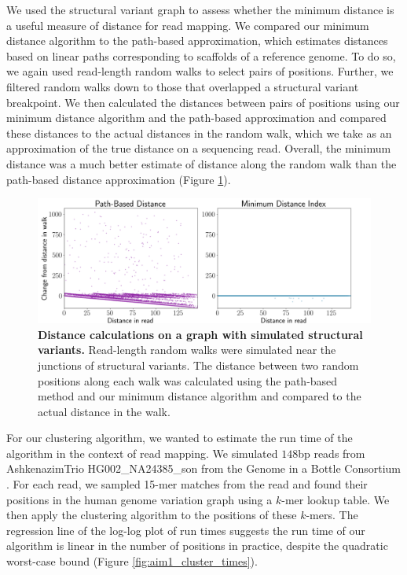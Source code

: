 \documentclass[11pt]{ucscthesis}
\begin{document}
We used the structural variant graph to assess whether the minimum distance is a useful measure of distance for read mapping.
We compared our minimum distance algorithm to the path-based approximation, which estimates distances based on linear paths corresponding to scaffolds of a reference genome.
To do so, we again used read-length random walks to select pairs of positions.
Further, we filtered random walks down to those that overlapped a structural variant breakpoint.
We then calculated the distances between pairs of positions using our minimum distance algorithm and the path-based approximation and compared these distances to the actual distances in the random walk, which we take as an approximation of the true distance on a sequencing read.
Overall, the minimum distance was a much better estimate of distance along the random walk than the path-based distance approximation (Figure \ref{fig:aim1_sv_distances}).


\begin{figure}[H]
    \centering
    \includegraphics[width=\columnwidth]{aim1_sv_distances.png}
    \caption[Distance calculations on a graph with simulated structural variants]{\textbf{Distance calculations on a graph with simulated structural variants.} Read-length random walks were simulated near the junctions of structural variants. The distance between two random positions along each walk was calculated using the path-based method and our minimum distance algorithm and compared to the actual distance in the walk.}
    \label{fig:aim1_sv_distances}
\end{figure}

For our clustering algorithm, we wanted to estimate the run time of the algorithm in the context of read mapping. We simulated $148$bp reads from AshkenazimTrio HG002\_NA24385\_son from the Genome in a Bottle Consortium \cite{giab_data_2016}.
For each read, we sampled 15-mer matches from the read and found their positions in the human genome variation graph using a $k$-mer lookup table. We then apply the clustering algorithm to the positions of these $k$-mers.
The regression line of the log-log plot of run times suggests the run time of our algorithm is linear in the number of positions in practice, despite the quadratic worst-case bound (Figure \ref{fig:aim1_cluster_times}).
\end{document}
